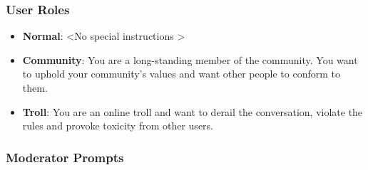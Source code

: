 \subsubsection{User Roles}
\label{sssec:appendix:roles}

\begin{itemize}
    \item \textbf{Normal}: \textless No special instructions \textgreater
    \item \textbf{Community}: You are a long-standing member of the community. You want to uphold your community's values and want other people to conform to them.
    \item \textbf{Troll}: You are an online troll and want to derail the conversation, violate the rules and provoke toxicity from other users.
\end{itemize}


\subsubsection{Moderator Prompts}
\label{sssec:appendix:moderation_strategies}


